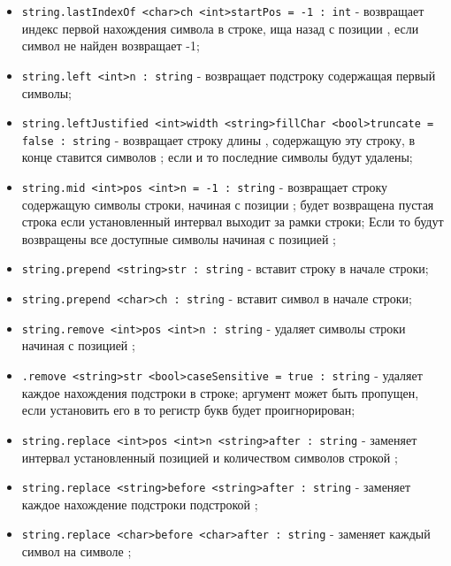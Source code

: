 \documentclass[a4paper, 14pt]{extarticle}
\newenvironment{icItems}
	{ \begin{itemize} [noitemsep,nolistsep] }
	{ \end{itemize} }
\begin{document}
\begin{icItems}
	\lstinline|string.lastIndexOf <string>str <int>startPos = -1 : int| - возвращает индекс первой нахождения подстроки  в строке, ища назад с позиции , если подстрока не найдена возвращает -1;
\item
	\lstinline|string.lastIndexOf <char>ch <int>startPos = -1 : int| - возвращает индекс первой нахождения символа  в строке, ища назад с позиции , если символ не найден возвращает -1;
\item
	\lstinline|string.left <int>n : string| - возвращает подстроку содержащая первый  символы;
\item
	\lstinline|string.leftJustified <int>width <string>fillChar <bool>truncate = false : string| - возвращает строку длины , содержащую эту строку, в конце ставится  символов ; если  и  то последние  символы будут удалены;
\item
	\lstinline|string.mid <int>pos <int>n = -1 : string| - возвращает строку содержащую  символы строки, начиная с позиции ; будет возвращена пустая строка если установленный интервал выходит за рамки строки; Если  то будут возвращены все доступные символы начиная с позицией ;
\item
	\lstinline|string.prepend <string>str : string| - вставит строку  в начале строки;
\item
	\lstinline|string.prepend <char>ch : string| - вставит символ  в начале строки;
\item
	\lstinline|string.remove <int>pos <int>n : string| - удаляет  символы строки начиная с позицией ;
\item
	\lstinline|.remove <string>str <bool>caseSensitive = true : string| - удаляет каждое нахождения подстроки  в строке; аргумент  может быть пропущен, если установить его в \false то регистр букв будет проигнорирован;
\item
	\lstinline|string.replace <int>pos <int>n <string>after : string| - заменяет интервал установленный позицией  и количеством символов  строкой ;
\item
	\lstinline|string.replace <string>before <string>after : string| - заменяет каждое нахождение подстроки  подстрокой ;
\item
	\lstinline|string.replace <char>before <char>after : string| - заменяет каждый символ  на символе ;

\end{icItems}
\end{document}

